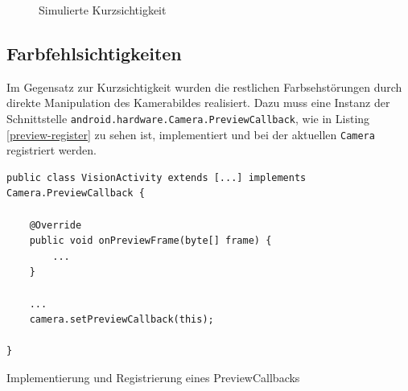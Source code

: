 \documentclass[a4paper]{article}
\begin{document}
\begin{figure}[H]
\centering
{}
\caption{Simulierte Kurzsichtigkeit}
\label{simulated-myopia}
\end{figure}

\newpage

\subsection*{Farbfehlsichtigkeiten}
Im Gegensatz zur Kurzsichtigkeit wurden die restlichen Farbsehstörungen durch direkte Manipulation des Kamerabildes realisiert. Dazu muss eine Instanz der Schnittstelle \texttt{android.hardware.Camera.PreviewCallback}, wie in Listing \ref{preview-register} zu sehen ist, implementiert und bei der aktuellen \texttt{Camera} registriert werden.

\begin{listing}[H]
\begin{verbatim}
public class VisionActivity extends [...] implements Camera.PreviewCallback {

    @Override
    public void onPreviewFrame(byte[] frame) {
        ...
    }

    ...
    camera.setPreviewCallback(this);

}
\end{verbatim}
\caption{Implementierung und Registrierung eines PreviewCallbacks}
\label{preview-register}
\end{listing}
\end{document}

